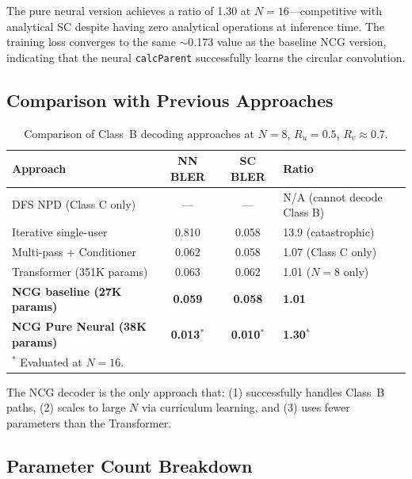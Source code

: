 \documentclass[11pt,a4paper]{article}
\begin{document}
The pure neural version achieves a ratio of 1.30 at $N = 16$---competitive with analytical SC despite having zero analytical operations at inference time. The training loss converges to the same $\sim$0.173 value as the baseline NCG version, indicating that the neural \texttt{calcParent} successfully learns the circular convolution.

\subsection{Comparison with Previous Approaches}

\begin{table}[H]
\centering
\caption{Comparison of Class~B decoding approaches at $N = 8$, $R_u = 0.5$, $R_v \approx 0.7$.}
\label{tab:comparison}
\begin{tabular}{lccl}
\toprule
Approach & NN BLER & SC BLER & Ratio \\
\midrule
DFS NPD (Class C only) & --- & --- & N/A (cannot decode Class B) \\
Iterative single-user & 0.810 & 0.058 & 13.9 (catastrophic) \\
Multi-pass + Conditioner & 0.062 & 0.058 & 1.07 (Class C only) \\
Transformer (351K params) & 0.063 & 0.062 & 1.01 ($N{=}8$ only) \\
\textbf{NCG baseline (27K params)} & \textbf{0.059} & \textbf{0.058} & \textbf{1.01} \\
\textbf{NCG Pure Neural (38K params)} & \textbf{0.013}$^*$ & \textbf{0.010}$^*$ & \textbf{1.30}$^*$ \\
\bottomrule
\multicolumn{4}{l}{\footnotesize $^*$ Evaluated at $N = 16$.}
\end{tabular}
\end{table}

The NCG decoder is the only approach that: (1) successfully handles Class~B paths, (2) scales to large $N$ via curriculum learning, and (3) uses fewer parameters than the Transformer.

\subsection{Parameter Count Breakdown}
\end{document}
